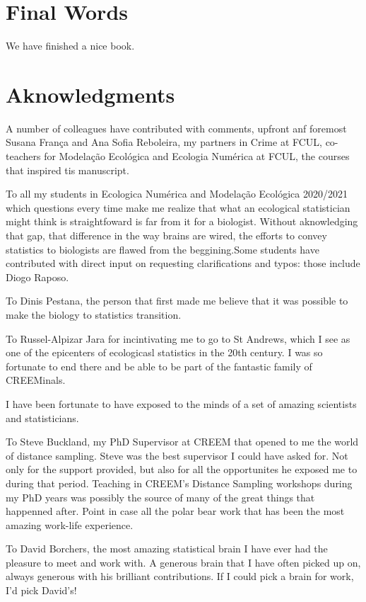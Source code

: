 \documentclass[
]{book}
\begin{document}
\hypertarget{final-words}{%
\chapter{Final Words}\label{final-words}}

We have finished a nice book.

\hypertarget{aknowledgments}{%
\chapter{Aknowledgments}\label{aknowledgments}}

A number of colleagues have contributed with comments, upfront anf foremost Susana França and Ana Sofia Reboleira, my partners in Crime at FCUL, co-teachers for Modelação Ecológica and Ecologia Numérica at FCUL, the courses that inspired tis manuscript.

To all my students in Ecologica Numérica and Modelação Ecológica 2020/2021 which questions every time make me realize that what an ecological statistician might think is straightfoward is far from it for a biologist. Without aknowledging that gap, that difference in the way brains are wired, the efforts to convey statistics to biologists are flawed from the beggining.Some students have contributed with direct input on requesting clarifications and typos: those include Diogo Raposo.

To Dinis Pestana, the person that first made me believe that it was possible to make the biology to statistics transition.

To Russel-Alpizar Jara for incintivating me to go to St Andrews, which I see as one of the epicenters of ecologicasl statistics in the 20th century. I was so fortunate to end there and be able to be part of the fantastic family of CREEMinals.

I have been fortunate to have exposed to the minds of a set of amazing scientists and statisticians.

To Steve Buckland, my PhD Supervisor at CREEM that opened to me the world of distance sampling. Steve was the best supervisor I could have asked for. Not only for the support provided, but also for all the opportunites he exposed me to during that period. Teaching in CREEM's Distance Sampling workshops during my PhD years was possibly the source of many of the great things that happenned after. Point in case all the polar bear work that has been the most amazing work-life experience.

To David Borchers, the most amazing statistical brain I have ever had the pleasure to meet and work with. A generous brain that I have often picked up on, always generous with his brilliant contributions. If I could pick a brain for work, I'd pick David's!
\end{document}
